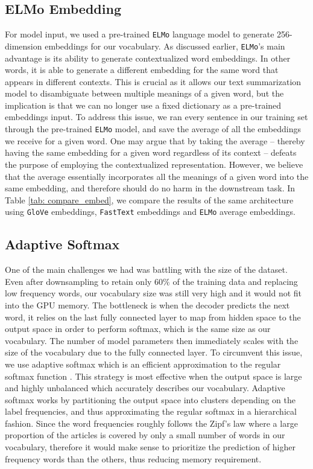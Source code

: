 \subsection{ELMo Embedding}
For model input, we used a pre-trained \texttt{ELMo} language model \cite{peters2018deep} to generate 256-dimension embeddings for our vocabulary. As discussed earlier, \texttt{ELMo}'s main advantage is its ability to generate contextualized word embeddings. In other words, it is able to generate a different embedding for the same word that appears in different contexts. This is crucial as it allows our text summarization model to disambiguate between multiple meanings of a given word, but the implication is that we can no longer use a fixed dictionary as a pre-trained embeddings input. To address this issue, we ran every sentence in our training set through the pre-trained \texttt{ELMo} model, and save the average of all the embeddings we receive for a given word. One may argue that by taking the average -- thereby having the same embedding for a given word regardless of its context -- defeats the purpose of employing the contextualized representation. However, we believe that the average essentially incorporates all the meanings of a given word into the same embedding, and therefore should do no harm in the downstream task. In Table \ref{tab: compare_embed}, we compare the results of the same architecture using \texttt{GloVe} embeddings, \texttt{FastText} embeddings and \texttt{ELMo} average embeddings. 

\subsection{Adaptive Softmax}
One of the main challenges we had was battling with the size of the dataset. Even after downsampling to retain only $60\%$ of the training data and replacing low frequency words, our vocabulary size was still very high and it would not fit into the GPU memory. The bottleneck is when the decoder predicts the next word, it relies on the last fully connected layer to map from hidden space to the output space in order to perform softmax, which is the same size as our vocabulary. The number of model parameters then immediately scales with the size of the vocabulary due to the fully connected layer. To circumvent this issue, we use adaptive softmax which is an efficient approximation to the regular softmax function \cite{grave2016efficient}. This strategy is most effective when the output space is large and highly unbalanced which accurately describes our vocabulary. Adaptive softmax works by partitioning the output space into clusters depending on the label frequencies, and thus approximating the regular softmax in a hierarchical fashion. Since the word frequencies roughly follows the Zipf's law \cite{wilson1949human} where a large proportion of the articles is covered by only a small number of words in our vocabulary, therefore it would make sense to prioritize the prediction of higher frequency words than the others, thus reducing memory requirement.


